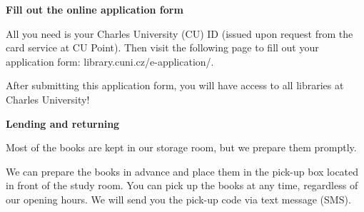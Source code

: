 

\ifdefined\ikonka\else%
\newcommand\ikonka[1]{\bigskip\bgroup\Large #1\egroup\par}
\renewcommand\section[2][]{%
  \bgroup\large \textbf{#2}\egroup\par%
}
\fi
\ikonka{\faPencil}
\section{Fill out the online application form}


All you need is your Charles University (CU) ID (issued upon request from  
the card service at CU Point). Then visit the following page
to fill out your application form:
library.cuni.cz/e-application/.

After submitting this application form, you will have access to all libraries at Charles University!

\ikonka{\faBook}
\section{Lending and returning }

Most of the books are kept in our storage room, but we prepare them promptly.

We can prepare the books in advance and place them in the pick-up box located
in front of the study room. You can pick up the books at any time, regardless
of our opening hours. We will send you the pick-up code via text message (SMS).


